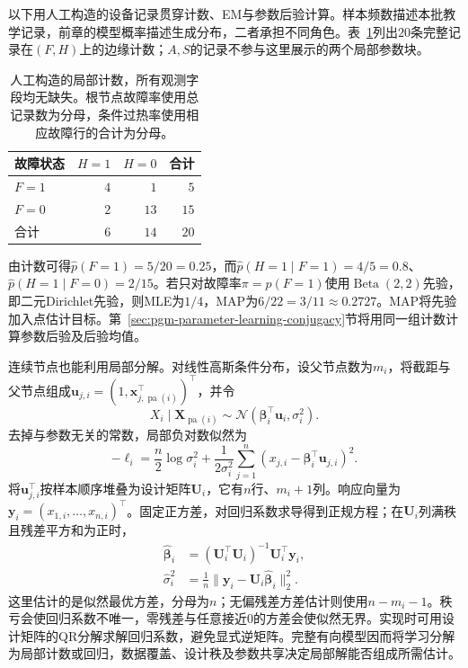以下用人工构造的设备记录贯穿计数、EM与参数后验计算。样本频数描述本批教学记录，前章的模型概率描述生成分布，二者承担不同角色。表~\ref{tab:pgm-parameter-learning-device-counts}列出$20$条完整记录在$(F,H)$上的边缘计数；$A,S$的记录不参与这里展示的两个局部参数块。

\begin{table}[htbp]
  \centering
  \begin{tabular}{lrrr}
    \toprule
    故障状态 & $H=1$ & $H=0$ & 合计\\
    \midrule
    $F=1$ & $4$ & $1$ & $5$\\
    $F=0$ & $2$ & $13$ & $15$\\
    \midrule
    合计 & $6$ & $14$ & $20$\\
    \bottomrule
  \end{tabular}
  \caption{人工构造的局部计数，所有观测字段均无缺失。根节点故障率使用总记录数为分母，条件过热率使用相应故障行的合计为分母。}
  \label{tab:pgm-parameter-learning-device-counts}
\end{table}

由计数可得$\widehat p(F=1)=5/20=0.25$，而$\widehat p(H=1\mid F=1)=4/5=0.8$、$\widehat p(H=1\mid F=0)=2/15$。若只对故障率$\pi=p(F=1)$使用$\operatorname{Beta}(2,2)$先验，即二元Dirichlet先验，则MLE为$1/4$，MAP为$6/22=3/11\approx0.2727$。MAP将先验加入点估计目标。第~\ref{sec:pgm-parameter-learning-conjugacy}节将用同一组计数计算参数后验及后验均值。

连续节点也能利用局部分解。对线性高斯条件分布，设父节点数为$m_i$，将截距与父节点组成$\bm{u}_{j,i}=(1,\bm{x}_{j,\operatorname{pa}(i)}^\top)^\top$，并令
\[
  X_i\mid\bm{X}_{\operatorname{pa}(i)}
  \sim\mathcal{N}(\bm{\beta}_i^\top\bm{u}_i,\sigma_i^2).
\]
去掉与参数无关的常数，局部负对数似然为
\[
  -\ell_i
  =\frac{n}{2}\log\sigma_i^2+
    \frac{1}{2\sigma_i^2}
      \sum_{j=1}^n(x_{j,i}-\bm{\beta}_i^\top\bm{u}_{j,i})^2.
\]
将$\bm{u}_{j,i}^\top$按样本顺序堆叠为设计矩阵$\bm{U}_i$，它有$n$行、$m_i+1$列。响应向量为$\bm{y}_i=(x_{1,i},\ldots,x_{n,i})^\top$。固定正方差，对回归系数求导得到正规方程；在$\bm{U}_i$列满秩且残差平方和为正时，
\begin{equation}
  \begin{aligned}
    \widehat{\bm{\beta}}_i
      &=(\bm{U}_i^\top\bm{U}_i)^{-1}\bm{U}_i^\top\bm{y}_i,\\
    \widehat{\sigma}_i^2
      &=\frac{1}{n}
        \lVert\bm{y}_i-\bm{U}_i\widehat{\bm{\beta}}_i\rVert_2^2.
  \end{aligned}
  \label{eq:pgm-parameter-learning-gaussian-mle}
\end{equation}
这里估计的是似然最优方差，分母为$n$；无偏残差方差估计则使用$n-m_i-1$。秩亏会使回归系数不唯一，零残差与任意接近$0$的方差会使似然无界。实现时可用设计矩阵的QR分解求解回归系数，避免显式逆矩阵。完整有向模型因而将学习分解为局部计数或回归，数据覆盖、设计秩及参数共享决定局部解能否组成所需估计。

